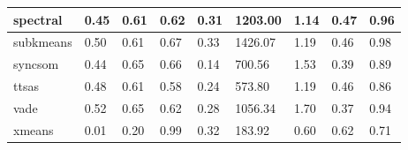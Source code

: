\begin{table}[H]
\begin{tabular}{|l|l|l|l|l|l|l|l|l|}
\hline
spectral & 0.45 & 0.61 & 0.62 & 0.31 & 1203.00 & 1.14 & 0.47 & 0.96 \\
\hline
subkmeans & 0.50 & 0.61 & 0.67 & 0.33 & 1426.07 & 1.19 & 0.46 & 0.98 \\
\hline
syncsom & 0.44 & 0.65 & 0.66 & 0.14 & 700.56 & 1.53 & 0.39 & 0.89 \\
\hline
ttsas & 0.48 & 0.61 & 0.58 & 0.24 & 573.80 & 1.19 & 0.46 & 0.86 \\
\hline
vade & 0.52 & 0.65 & 0.62 & 0.28 & 1056.34 & 1.70 & 0.37 & 0.94 \\
\hline
xmeans & 0.01 & 0.20 & 0.99 & 0.32 & 183.92 & 0.60 & 0.62 & 0.71 \\
\hline
\end{tabular}
\end{table}



